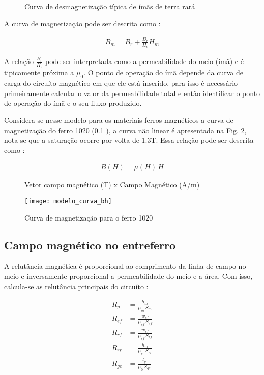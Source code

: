 \begin{figure}[!ht]
	\centering
	\def\svgwidth{0.7\columnwidth}
	
	\caption{Curva de desmagnetização típica de ímãs de terra rará}
	\label{Fig:Modelagem:circuito:passivo:ima}
\end{figure}

A curva de magnetização pode ser descrita como :

\begin{align}
	B_m = B_r + \frac{B_r}{H_c} H_m
	\label{eq:p:ima}
\end{align}

A relação $\frac{B_r}{H_c}$ pode ser interpretada como a permeabilidade do meio (ímã) e é tipicamente próxima a $\mu_0$. O ponto de operação do ímã depende da curva de carga do circuíto magnético em que ele está inserido, para isso é necessário primeiramente calcular o valor da permeabilidade total e então identificar o ponto de operação do ímã e o seu fluxo produzido.

Considera-se nesse modelo para os materiais ferros magnéticos a curva de magnetização do ferro 1020 (\ref{} ), a curva não linear é apresentada na Fig. \ref{Fig:Modelagem:BH}, nota-se que a saturação ocorre por volta de 1.3T. Essa relação pode ser descrita como :

\begin{align}
	B(H) = \mu(H) \, H
	\label{eq:p:BH:ferro}
\end{align}

\begin{figure}[!ht]
\centering
	\caption*{ Vetor campo magnético (T) x Campo Magnético (A/m)}
 	\texttt{[image: modelo\_curva\_bh]}
	\caption{Curva de magnetização para o ferro 1020}
	\label{Fig:Modelagem:BH}
\end{figure}


\subsection{Campo magnético no entreferro}

A relutância magnética é proporcional ao comprimento da linha de campo no meio e inversamente proporcional a permeabilidade do meio e a área. Com isso, calcula-se as relutância principais do circuíto :

\begin{align}
	 R_{p}  &= \frac{h_m}{\mu_m \, S_m}			\\
	 R_{ef} &= \frac{w_{ef}}{\mu_{ef}\, S_{ef}}  \\     
	 R_{rf} &= \frac{w_{rf}}{\mu_{rf}\, S_{rf}}   \\    
	 R_{rr} &= \frac{h_m}{\mu_{rr} \, S_{rr}}     \\      
	 R_{ge} &= \frac{l_g}{\mu_0  \, S_{ge}}        
\end{align}

